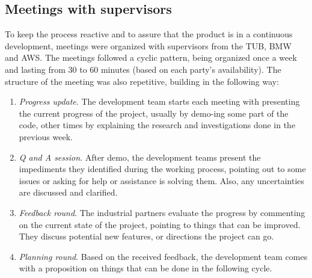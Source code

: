         \subsection{Meetings with supervisors}
        To keep the process reactive and to assure that the product is in a continuous development, meetings were organized with supervisors from the TUB, BMW and AWS. The meetings followed a cyclic pattern, being organized once a week and lasting from 30 to 60 minutes (based on each party’s availability). The structure of the meeting was also repetitive, building in the following way:
        \begin{enumerate}
            \item \textit{Progress update}. The development team starts each meeting with presenting the current progress of the project, usually by demo-ing some part of the code, other times by explaining the research and investigations done in the previous week.
            \item \textit{Q and A session}. After demo, the development teams present the impediments they identified during the working process, pointing out to some issues or asking for help or assistance is solving them. Also, any uncertainties are discussed and clarified.
            \item \textit{Feedback round}. The industrial partners evaluate the progress by commenting on the current state of the project, pointing to things that can be improved. They discuss potential new features, or directions the project can go.
            \item \textit{Planning round}. Based on the received feedback, the development team comes with a proposition on things that can be done in the following cycle.
        \end{enumerate}